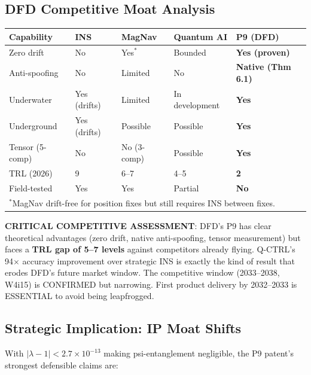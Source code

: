 \documentclass[11pt]{article}
\theoremstyle{definition}
\theoremstyle{remark}
\newcommand{\ee}[1]{\times10^{#1}}
\begin{document}
\subsection{DFD Competitive Moat Analysis}

\begin{center}
\begin{tabular}{p{3.5cm}p{2.5cm}p{2.5cm}p{2.5cm}p{2.5cm}}
\toprule
\textbf{Capability} & \textbf{INS} & \textbf{MagNav} & \textbf{Quantum AI} & \textbf{P9 (DFD)} \\
\midrule
Zero drift & No & Yes$^*$ & Bounded & \textbf{Yes (proven)} \\
Anti-spoofing & No & Limited & No & \textbf{Native (Thm 6.1)} \\
Underwater & Yes (drifts) & Limited & In development & \textbf{Yes} \\
Underground & Yes (drifts) & Possible & Possible & \textbf{Yes} \\
Tensor (5-comp) & No & No (3-comp) & Possible & \textbf{Yes} \\
TRL (2026) & 9 & 6--7 & 4--5 & \textbf{2} \\
Field-tested & Yes & Yes & Partial & \textbf{No} \\
\bottomrule
\multicolumn{5}{l}{\small $^*$MagNav drift-free for position fixes but still requires INS between fixes.}
\end{tabular}
\end{center}

\begin{tcolorbox}[colback=orange!5!white, colframe=orange!70!black]
\textbf{CRITICAL COMPETITIVE ASSESSMENT}: DFD's P9 has clear theoretical
advantages (zero drift, native anti-spoofing, tensor measurement) but faces a
\textbf{TRL gap of 5--7 levels} against competitors already flying.
Q-CTRL's 94$\times$ accuracy improvement over strategic INS is exactly the
kind of result that erodes DFD's future market window. The competitive window
(2033--2038, W4i15) is CONFIRMED but narrowing. First product delivery by
2032--2033 is ESSENTIAL to avoid being leapfrogged.
\end{tcolorbox}

\subsection{Strategic Implication: IP Moat Shifts}

With $|\lambda - 1| < 2.7\ee{-13}$ making psi-entanglement negligible, the
P9 patent's strongest defensible claims are:
\end{document}
